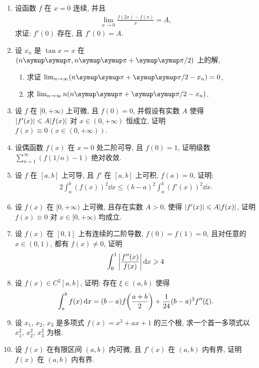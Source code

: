 \documentclass{ctexart}
\let\umathpi\pi
\renewcommand\pi{\symup\umathpi}%
\let\ge\geqslant
\let\le\leqslant
\newcommand{\limit}[2]{\lim_{#1 \to #2}}
\begin{document}
\begin{enumerate}[series=exer]
    \item 设函数 $ f $ 在 $ x = 0 $ 连续, 并且
    \begin{align*}
        \limit{x}{0}\frac{f(2x) - f(x)}{x} = A,
    \end{align*}
    求证: $ f'(0) $ 存在, 且 $ f'(0) = A $. 
    \item 设 $ x_{n} $ 是 $ \tan x = x $ 在 $ (n\pi, n\pi + \pi/2) $ 上的解,
    \begin{enumerate}
        \item 求证 $ \limit{n}{\infty}(n\pi + \pi/2 - x_{n}) = 0 $,
        \item 求 $ \limit{n}{\infty} n(n\pi + \pi/2 - x_{n}) $.  
    \end{enumerate}
    \item 设 $ f $ 在 $ [0, +\infty) $ 上可微, 且 $ f(0) = 0 $, 并假设有实数 $ A $ 使得 $ \abs{f'(x)} \le A\abs{f(x)} $ 对 $ x \in (0, +\infty) $ 恒成立, 证明 $ f(x) \equiv 0\,(x \in (0, +\infty)) $.  
    \item 设偶函数 $ f(x) $ 在 $ x = 0 $ 处二阶可导, 且 $ f(0) = 1 $, 证明级数 $ \sum_{n = 1}^{\infty} (f(1/n) - 1) $ 绝对收敛.
    \item 设 $ f $ 在 $ [a, b] $ 上可导, 且 $ f' $ 在 $ [a, b] $ 上可积, $ f(a) = 0 $, 证明:
    \begin{align*}
        2\int_{a}^{b}(f(x))^{2} \dd{x} \le (b-a)^{2} \int_{a}^{b} (f'(x))^{2} \dd{x}.
    \end{align*}
    \item 设 $ f(x) $ 在 $ [0, +\infty) $ 上可微, 且存在实数 $ A > 0 $, 使得 $ \abs{f'(x)} \le A\abs{f(x)} $, 证明 $ f(x) \equiv 0 $ 对 $ x \in [0, +\infty) $ 均成立.
    \item 设 $ f(x) $ 在 $ [0, 1] $ 上有连续的二阶导数, $ f(0) = f(1) = 0 $, 且对任意的 $ x \in (0, 1) $, 都有 $ f(x) \ne 0 $, 证明
    \begin{align*}
        \int_{0}^{1} \abs{f''(x)\over f(x)} \dd{x} \ge 4
    \end{align*}
    \item 设 $ f(x) \in C^{2}[a, b] $, 证明: 存在 $ \xi \in (a, b) $ 使得
    \begin{align*}
        \int_{a}^{b} f(x) \dd{x} = (b - a) f\qty(\frac{a + b}{2}) + \frac{1}{24}(b - a)^{3} f''(\xi).
    \end{align*}
    \item 设 $ x_{1} $, $ x_{2} $, $ x_{3} $ 是多项式 $ f(x) = x^{3} + ax + 1 $ 的三个根, 求一个首一多项式以 $ x_{1}^{2} $, $ x_{2}^{2} $, $ x_{3}^{2} $ 为根.
    \item 设 $ f(x) $ 在有限区间 $ (a, b) $ 内可微, 且 $ f'(x) $ 在 $ (a, b) $ 内有界, 证明 $ f(x) $ 在 $ (a, b) $ 内有界.

\end{enumerate}
\end{document}
